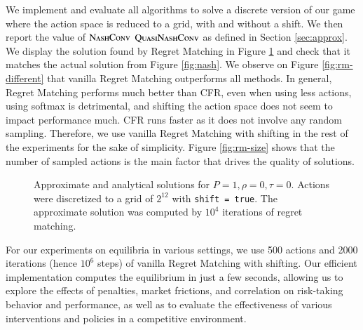 \documentclass[preprint,12pt,authoryear]{elsarticle}
\theoremstyle{definition}
\begin{document}
We implement and evaluate all algorithms to solve a discrete version of our game where the action space is reduced to a grid, with and without a shift. We then report the value of $\textsc{NashConv}$ $\textsc{QuasiNashConv}$ as defined in Section \ref{sec:approx}. We display the solution found by Regret Matching in Figure \ref{fig:rm-sol} and check that it matches the actual solution from Figure \ref{fig:nash}. We observe on Figure \ref{fig:rm-different} that vanilla Regret Matching outperforms all methods. In general, Regret Matching performs much better than CFR, even when using less actions, using softmax is detrimental, and shifting the action space does not seem to impact performance much. CFR runs faster as it does not involve any random sampling. Therefore, we use vanilla Regret Matching with shifting in the rest of the experiments for the sake of simplicity. Figure \ref{fig:rm-size} shows that the number of sampled actions is the main factor that drives the quality of solutions.

\begin{figure}[htbp]
  \centering
  
  \caption{Approximate and analytical solutions for $P=1, \rho=0, \tau=0$. Actions were discretized to a grid of $2^{12}$ with \texttt{shift~=~true}. The approximate solution was computed by $10^4$ iterations of regret matching.}
  \label{fig:rm-sol}  
\end{figure}



For our experiments on equilibria in various settings, we use 500 actions and 2000 iterations (hence $10^6$ steps) of vanilla Regret Matching with shifting. Our efficient implementation computes the equilibrium in just a few seconds, allowing us to explore the effects of penalties, market frictions, and correlation on risk-taking behavior and performance, as well as to evaluate the effectiveness of various interventions and policies in a competitive environment.
\end{document}
